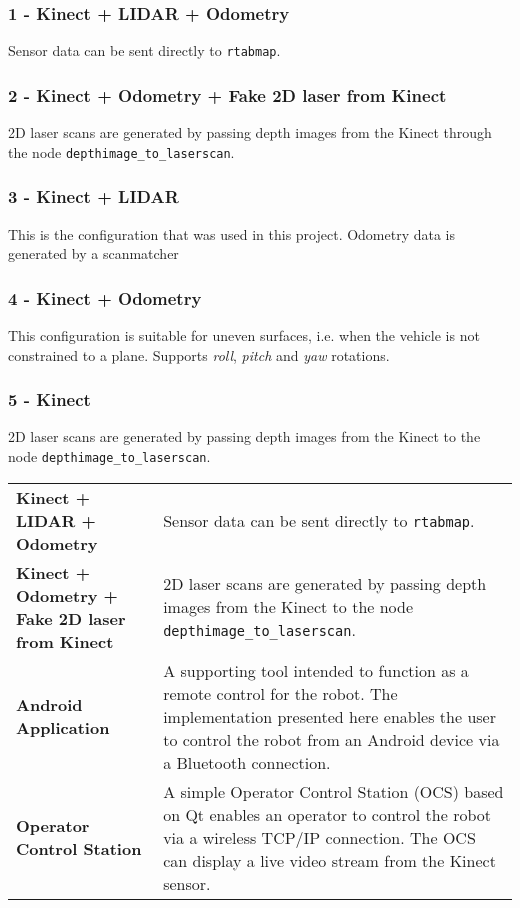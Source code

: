 \subsubsection{1 - Kinect + LIDAR + Odometry} 
Sensor data can be sent directly to \texttt{rtabmap}.

\subsubsection{2 - Kinect + Odometry + Fake 2D laser from Kinect}

2D laser scans are generated by passing depth images from the Kinect through the node \texttt{depthimage\_to\_laserscan}.

\subsubsection{3 - Kinect + LIDAR}

This is the configuration that was used in this project. Odometry data is generated by a scanmatcher 

\subsubsection{4 - Kinect + Odometry}

This configuration is suitable for uneven surfaces, i.e. when the vehicle is not constrained to a plane. Supports \textit{roll}, \textit{pitch} and \textit{yaw} rotations.

\subsubsection{5 - Kinect}

2D laser scans are generated by passing depth images from the Kinect to the node \texttt{depthimage\_to\_laserscan}.

\begin{center}
	\begin{tabular}{ l p{7cm} }
		\textbf{Kinect + LIDAR + Odometry} & Sensor data can be sent directly to \texttt{rtabmap}.\\
		\textbf{Kinect + Odometry + Fake 2D laser from Kinect} & 2D laser scans are generated by passing depth images from the Kinect to the node \texttt{depthimage\_to\_laserscan}.\\
		\textbf{Android Application} & A supporting tool intended to function as a remote control for the robot. The implementation presented here enables the user to control the robot from an Android device via a Bluetooth connection.\\
		\textbf{Operator Control Station} & A simple Operator Control Station (OCS) based on Qt enables an operator to control the robot via a wireless TCP/IP connection. The \ac{OCS} can display a live video stream from the Kinect sensor. \\
	\end{tabular}
\end{center}

